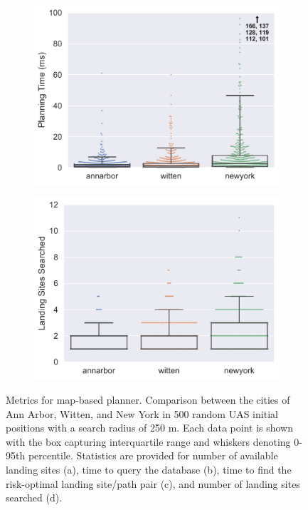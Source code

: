 \begin{figure}[ht]
\begin{subfigure}[b]{0.475\textwidth}
    \centering\includegraphics[width=\textwidth]{chapter_5_mapping/imgs/random_time_bw.pdf}
    \caption{\label{fig:ch5_random_plan_time}}
  \end{subfigure}%
  \quad
  \begin{subfigure}[b]{0.475\textwidth}
    \centering\includegraphics[width=\textwidth]{chapter_5_mapping/imgs/random_total_goal_searches_bw.pdf}
    \caption{\label{fig:ch5_random_ls_searched}}
  \end{subfigure}%
  \caption[Metrics for map-based planner]{Metrics for map-based planner. Comparison between the cities of Ann Arbor, Witten, and New York in 500 random \ac{UAS} initial positions with a search radius of 250 m. Each data point is shown with the box capturing interquartile range and whiskers denoting 0-95th percentile. Statistics are provided for number of available landing sites (a), time to query the database (b), time to find the risk-optimal landing site/path pair (c), and number of landing sites searched (d).}
  \label{fig:ch5_random_stats}
\end{figure}



